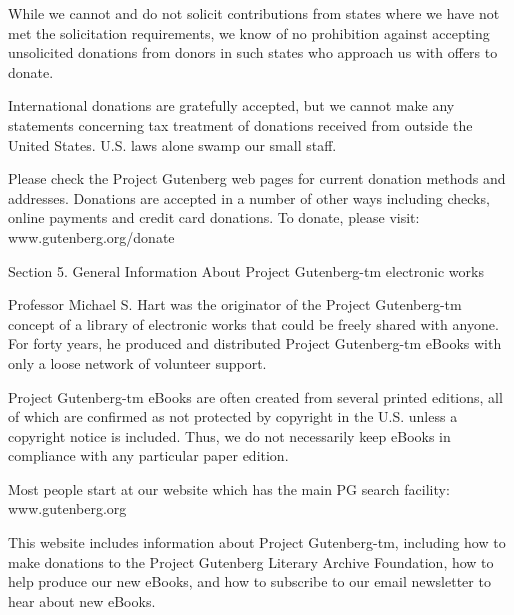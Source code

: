 \documentclass[oneside]{book}
\begin{document}
While we cannot and do not solicit contributions from states where we
have not met the solicitation requirements, we know of no prohibition
against accepting unsolicited donations from donors in such states who
approach us with offers to donate.

International donations are gratefully accepted, but we cannot make
any statements concerning tax treatment of donations received from
outside the United States. U.S. laws alone swamp our small staff.

Please check the Project Gutenberg web pages for current donation
methods and addresses. Donations are accepted in a number of other
ways including checks, online payments and credit card donations. To
donate, please visit: www.gutenberg.org/donate

Section 5. General Information About Project Gutenberg-tm electronic works

Professor Michael S. Hart was the originator of the Project
Gutenberg-tm concept of a library of electronic works that could be
freely shared with anyone. For forty years, he produced and
distributed Project Gutenberg-tm eBooks with only a loose network of
volunteer support.

Project Gutenberg-tm eBooks are often created from several printed
editions, all of which are confirmed as not protected by copyright in
the U.S. unless a copyright notice is included. Thus, we do not
necessarily keep eBooks in compliance with any particular paper
edition.

Most people start at our website which has the main PG search
facility: www.gutenberg.org

This website includes information about Project Gutenberg-tm,
including how to make donations to the Project Gutenberg Literary
Archive Foundation, how to help produce our new eBooks, and how to
subscribe to our email newsletter to hear about new eBooks.
\end{document}
